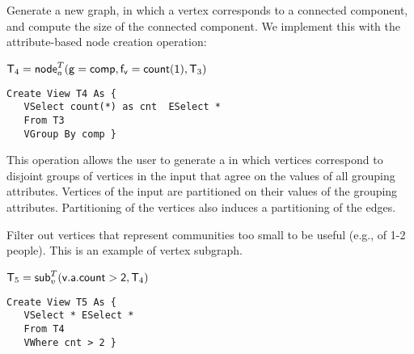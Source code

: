 

\begin{example}
\label{ex:nodecra}

Generate a new graph, in which a vertex corresponds to a connected
component, and compute the size of the connected component.  We
implement this with the attribute-based node creation operation:

$\mathsf{T}_4 = \textsf{node}^T_a(\mathsf{g=comp,f_v=count(1)},\mathsf{T}_3)$

\begin{small} 
\begin{verbatim}
Create View T4 As { 
   VSelect count(*) as cnt  ESelect *
   From T3
   VGroup By comp }
\end{verbatim}
\end{small}

\end{example}

This operation allows the user to generate a \tg in which vertices
correspond to disjoint groups of vertices in the input that agree on
the values of all grouping attributes.  Vertices of the input are
partitioned on their values of the grouping attributes.  Partitioning
of the vertices also induces a partitioning of the edges.

\begin{example}
\label{ex:subg}

Filter out vertices that represent communities too small to be
  useful (e.g., of 1-2 people).  This is an example of vertex
  subgraph.

$\mathsf{T}_5 = \textsf{sub}^T_v(\mathsf{v.a.count > 2},\mathsf{T}_4)$

\begin{small} 
\begin{verbatim}
Create View T5 As {
   VSelect * ESelect *
   From T4
   VWhere cnt > 2 }
\end{verbatim}
\end{small}
\end{example}

